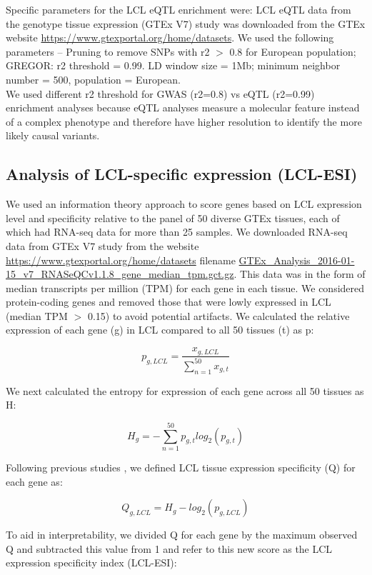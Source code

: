 Specific parameters for the LCL eQTL enrichment were: LCL eQTL data from the genotype tissue expression (GTEx V7) study was downloaded from the GTEx website \url{https://www.gtexportal.org/home/datasets}. We used the following parameters – Pruning to remove SNPs with r2 $>$ 0.8 for European population; GREGOR: r2 threshold = 0.99. LD window size = 1Mb; minimum neighbor number = 500, population = European. \\

We used different r2 threshold for GWAS (r2=0.8) vs eQTL (r2=0.99) enrichment analyses because eQTL analyses measure a molecular feature instead of a complex phenotype and therefore have higher resolution to identify the more likely causal variants.

\subsection{Analysis of LCL-specific expression (LCL-ESI)}
We used an information theory approach \cite{schugPromoterFeaturesRelated2005, heGlobalViewEnhancer2014} to score genes based on LCL expression level and specificity relative to the panel of 50 diverse GTEx tissues, each of which had RNA-seq data for more than 25 samples. We downloaded RNA-seq data from GTEx V7 study from the website \url{https://www.gtexportal.org/home/datasets} filename \url{GTEx\_Analysis\_2016-01-15\_v7\_RNASeQCv1.1.8\_gene\_median\_tpm.gct.gz}. This data was in the form of median transcripts per million (TPM) for each gene in each tissue. We considered protein-coding genes and removed those that were lowly expressed in LCL (median TPM $>$ 0.15) to avoid potential artifacts. We calculated the relative expression of each gene (g) in LCL compared to all 50 tissues (t) as p:

\[ p_{g,LCL} = \frac{x_{g, LCL}}{\sum_{n=1}^{50}x_{g,t}}  \]

We next calculated the entropy for expression of each gene across all 50 tissues as H:

\[ H_g = -\sum_{n=1}^{50}p_{g,t} log_2(p_{g,t}) \]

Following previous studies \cite{schugPromoterFeaturesRelated2005, heGlobalViewEnhancer2014}, we defined LCL tissue expression specificity (Q) for each gene as:

\[ Q_{g, LCL} = H_g - log_2(p_{g, LCL}) \]

To aid in interpretability, we divided Q for each gene by the maximum observed Q and subtracted this value from 1 and refer to this new score as the LCL expression specificity index (LCL-ESI):


